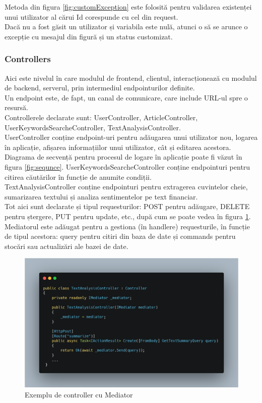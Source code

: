 Metoda din figura \ref{fig:customException} este folosită pentru validarea existenței unui utilizator al cărui Id corespunde cu cel din request.  \\ 
Dacă nu a fost găsit un utilizator și variabila este nulă, atunci o să se arunce o excepție cu mesajul din figură și un status customizat.

\subsubsection{Controllers}
Aici este nivelul în care modulul de frontend, clientul, interacționează cu modulul de backend, serverul, prin intermediul endpointurilor definite.\\
Un endpoint este, de fapt, un canal de comunicare, care include URL-ul spre o resursă.\\

Controllerele declarate sunt: UserController, ArticleController, UserKeywordsSearcheController, TextAnalysisController.\\
UserController conține endpoint-uri pentru adăugarea unui utilizator nou, logarea în aplicație, afișarea informațiilor unui utilizator, cât și editarea acestora. \\
Diagrama de secvență pentru procesul de logare în aplicație poate fi văzut în figura \ref{fig:sequnce}.
UserKeywordsSearcheController conține endpointuri pentru citirea căutărilor în funcție de anumite condiții. \\
TextAnalysisController conține endpointuri pentru extragerea cuvintelor cheie, sumarizarea textului și analiza sentimentelor pe text financiar.\\

Tot aici sunt declarate și tipul requesturilor: POST pentru adăugare, DELETE pentru ștergere, PUT pentru update, etc., după cum se poate vedea în figura \ref{fig:controllerExample}.
Mediatorul este adăugat pentru a gestiona (în handlere) requesturile, în funcție de tipul acestora: query pentru citiri din baza de date și commands pentru stocări sau actualizări ale bazei de date.

\begin{figure}[H]
	\centering
	\includegraphics[width=150mm]{figs/controllerExample.png}
	\caption{Exemplu de controller cu Mediator}
	\label{fig:controllerExample}
\end{figure}

